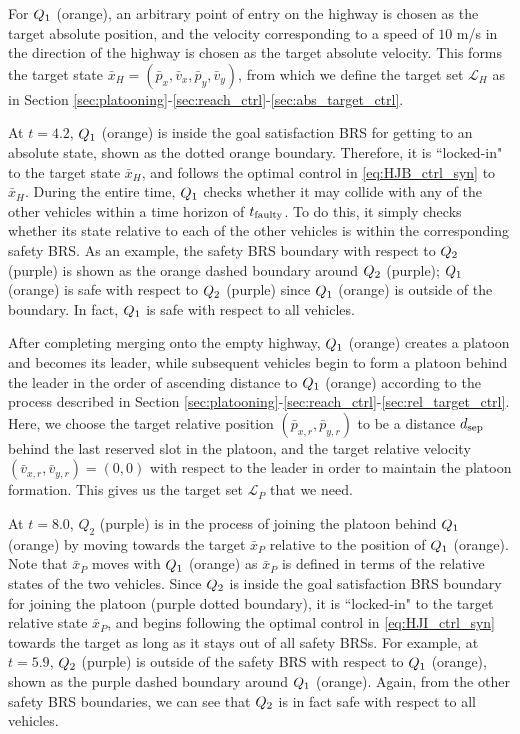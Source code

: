 For $Q_{1}$ (orange), an arbitrary point of entry on the highway is chosen as the target absolute position, and the velocity corresponding to a speed of $10$ m/s in the direction of the highway is chosen as the target absolute velocity. This forms the target state $\bar{x}_H=(\bar{p}_x, \bar{v}_x, \bar{p}_y, \bar{v}_y)$, from which we define the target set $\mathcal{L}_H$ as in Section \ref{sec:platooning}-\ref{sec:reach_ctrl}-\ref{sec:abs_target_ctrl}.

At $t=4.2$, $Q_{1}$ (orange) is inside the goal satisfaction BRS for getting to an absolute state, shown as the dotted orange boundary. Therefore, it is ``locked-in" to the target state $\bar{x}_H$, and follows the optimal control in \eqref{eq:HJB_ctrl_syn} to $\bar{x}_H$. During the entire time, $Q_{1}$ checks whether it may collide with any of the other vehicles within a time horizon of $t_\text{faulty}$. To do this, it simply checks whether its state relative to each of the other vehicles is within the corresponding safety BRS. As an example, the safety BRS boundary with respect to $Q_{2}$ (purple) is shown as the orange dashed boundary around $Q_{2}$ (purple); $Q_{1}$ (orange) is safe with respect to $Q_{2}$ (purple) since $Q_{1}$ (orange) is outside of the boundary. In fact, $Q_{1}$ is safe with respect to all vehicles.

After completing merging onto the empty highway, $Q_{1}$ (orange) creates a platoon and becomes its leader, while subsequent vehicles begin to form a platoon behind the leader in the order of ascending distance to $Q_{1}$ (orange) according to the process described in Section \ref{sec:platooning}-\ref{sec:reach_ctrl}-\ref{sec:rel_target_ctrl}. Here, we choose the target relative position $(\bar{p}_{x,r}, \bar{p}_{y,r})$ to be a distance $d_\text{sep}$ behind the last reserved slot in the platoon, and the target relative velocity $(\bar{v}_{x,r}, \bar{v}_{y,r}) = (0,0)$ with respect to the leader in order to maintain the platoon formation. This gives us the target set $\mathcal{L}_P$ that we need.

At $t=8.0$, $Q_2$ (purple) is in the process of joining the platoon behind $Q_{1}$ (orange) by moving towards the target $\bar{x}_P$ relative to the position of $Q_{1}$ (orange). Note that $\bar{x}_P$ moves with $Q_{1}$ (orange) as $\bar{x}_P$ is defined in terms of the relative states of the two vehicles. Since $Q_{2}$ is inside the goal satisfaction BRS boundary for joining the platoon (purple dotted boundary), it is ``locked-in" to the target relative state $\bar{x}_P$, and begins following the optimal control in \eqref{eq:HJI_ctrl_syn} towards the target as long as it stays out of all safety BRSs. For example, at $t=5.9$, $Q_{2}$ (purple) is outside of the safety BRS with respect to $Q_{1}$ (orange), shown as the purple dashed boundary around $Q_{1}$ (orange). Again, from the other safety BRS boundaries, we can see that $Q_{2}$ is in fact safe with respect to all vehicles.

